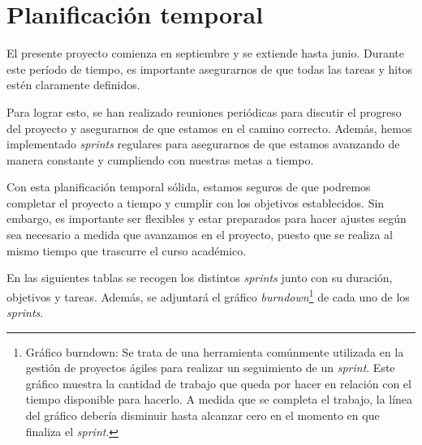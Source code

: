 \section{Planificación temporal}

El presente proyecto comienza en septiembre y se extiende hasta junio. Durante este período de tiempo, es importante asegurarnos de que todas las tareas y hitos estén claramente definidos.

Para lograr esto, se han realizado reuniones periódicas para discutir el progreso del proyecto y asegurarnos de que estamos en el camino correcto. Además, hemos implementado \textit{sprints} regulares para asegurarnos de que estamos avanzando de manera constante y cumpliendo con nuestras metas a tiempo.

Con esta planificación temporal sólida, estamos seguros de que podremos completar el proyecto a tiempo y cumplir con los objetivos establecidos. Sin embargo, es importante ser flexibles y estar preparados para hacer ajustes según sea necesario a medida que avanzamos en el proyecto, puesto que se realiza al mismo tiempo que trascurre el curso académico.

En las siguientes tablas se recogen los distintos \textit{sprints} junto con su duración, objetivos y tareas. Además, se adjuntará el gráfico \textit{burndown}\footnote{Gráfico burndown: Se trata de una herramienta comúnmente utilizada en la gestión de proyectos ágiles para realizar un seguimiento de un \textit{sprint}. Este gráfico muestra la cantidad de trabajo que queda por hacer en relación con el tiempo disponible para hacerlo. A medida que se completa el trabajo, la línea del gráfico debería disminuir hasta alcanzar cero en el momento en que finaliza el \textit{sprint}.} de cada uno de los \textit{sprints}.





